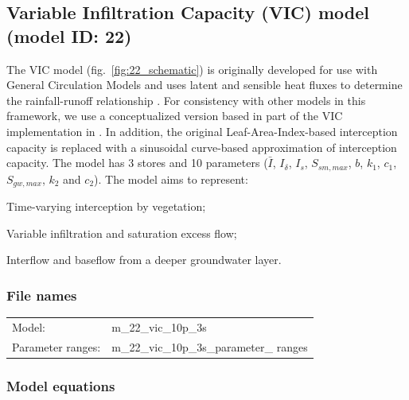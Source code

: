 \subsection{Variable Infiltration Capacity (VIC) model (model ID: 22)}
The VIC model (fig.~\ref{fig:22_schematic}) is originally developed for use with General Circulation Models and uses latent and sensible heat fluxes to determine the rainfall-runoff relationship \citep{Liang1994}. For consistency with other models in this framework, we use a conceptualized version based in part of the VIC implementation in \citet{Clark2008a}. In addition, the original Leaf-Area-Index-based interception capacity is replaced with a sinusoidal curve-based approximation of interception capacity. The model has 3 stores and 10 parameters ($\bar{I}$, $I_{\delta}$, $I_s$, $S_{sm,max}$, $b$, $k_1$, $c_1$, $S_{gw,max}$, $k_2$ and $c_2$). The model aims to represent:

\begin{itemizecompact}
\item Time-varying interception by vegetation;
\item Variable infiltration and saturation excess flow;
\item Interflow and baseflow from a deeper groundwater layer.
\end{itemizecompact}

\subsubsection{File names}
\begin{tabular}{@{}ll}
Model: &m\_22\_vic\_10p\_3s \\
Parameter ranges: &m\_22\_vic\_10p\_3s\_parameter\_ ranges \\
\end{tabular}

\subsubsection{Model equations}


